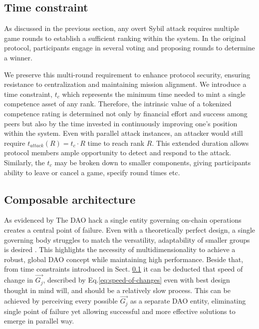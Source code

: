 \documentclass{article}
\begin{document}
\begin{CJK}{UTF8}{gbsn}
\begin{multicols}{2}
        \subsection{Time constraint}
        \label{sec:time-constraint}

        As discussed in the previous section, any overt Sybil attack requires multiple game rounds to establish a sufficient ranking within the system. In the original protocol, participants engage in several voting and proposing rounds to determine a winner.

        We preserve this multi-round requirement to enhance protocol security, ensuring resistance to centralization and maintaining mission alignment. We introduce a time constraint,  $t_c$ which represents the minimum time needed to mint a single competence asset of any rank.
        Therefore, the intrinsic value of a tokenized competence rating is determined not only by financial effort and success among peers but also by the time invested in continuously improving one's position within the system. Even with parallel attack instances, an attacker would still require $t_{attack}(R) = t_c \cdot R$ time to reach rank $R$. This extended duration allows protocol members ample opportunity to detect and respond to the attack. Similarly, the $t_c$ may be broken down to smaller components, giving participants ability to leave or cancel a game, specify round times etc.


        \subsection{Composable architecture}
        As evidenced by The DAO hack\cite{Liu2021} a single entity governing on-chain operations creates a central point of failure. Even with a theoretically perfect design, a single governing body struggles to match the versatility, adaptability of smaller groups is desired \cite{Buterin22}.  This highlights the necessity of multidimensionality to achieve a robust, global DAO concept while maintaining high performance.
        Beside that, from time constraints introduced in Sect. \ref{sec:time-constraint} it can be deducted that speed of change in ${\vec{G_j}}$, described by Eq.\ref{eq:speed-of-changes} even with best design thought in mind will, and should be a relatively slow process.
        This can be achieved by perceiving every possible ${\vec{G_j}}$ as a separate DAO entity, eliminating single point of failure yet allowing successful and more effective solutions to emerge in parallel way.


\end{multicols}
\end{CJK}
\end{document}
